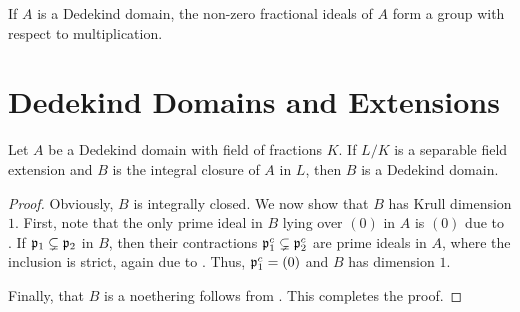\begin{corollary}
    If $A$ is a Dedekind domain, the non-zero fractional ideals of $A$ form a group with respect to multiplication.
\end{corollary}

\section{Dedekind Domains and Extensions}

\begin{theorem}
    Let $A$ be a Dedekind domain with field of fractions $K$. If $L/K$ is a separable field extension and $B$ is the integral closure of $A$ in $L$, then $B$ is a Dedekind domain.
\end{theorem}
\begin{proof}
    Obviously, $B$ is integrally closed. We now show that $B$ has Krull dimension $1$. First, note that the only prime ideal in $B$ lying over $(0)$ in $A$ is $(0)$ due to . If $\mathfrak p_1\subsetneq\mathfrak p_2$ in $B$, then their contractions $\mathfrak p_1^c\subsetneq\mathfrak p_2^c$ are prime ideals in $A$, where the inclusion is strict, again due to . Thus, $\mathfrak p_1^c = (0)$ and $B$ has dimension $1$.

    Finally, that $B$ is a noethering follows from . This completes the proof.
\end{proof}

